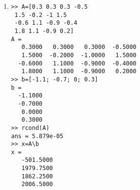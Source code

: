 \begin{exercise}
\begin{enumerate}
\item 
\begin{verbatim}
>> A=[0.3 0.3 0.3 -0.5
 1.5 -0.2 -1 1.5
 -0.6 1.1 -0.9 -0.4
 1.8 1.1 -0.9 0.2]
A =
   0.3000   0.3000   0.3000  -0.5000
   1.5000  -0.2000  -1.0000   1.5000
  -0.6000   1.1000  -0.9000  -0.4000
   1.8000   1.1000  -0.9000   0.2000
>> b=[-1.1; -0.7; 0; 0.3]
b =
  -1.1000
  -0.7000
   0.0000
   0.3000
>> rcond(A)
ans = 5.879e-05
>> x=A\b
x =
   -501.5000
   1979.7500
   1862.2500
   2006.5000
\end{verbatim}

\begin{comment}
\begin{verbatim}
m=round(2+2*rand),n=round(2+2*rand)
for it=1:999,A=0+round(randn(m,n)*10)/10; 
    if rcond(A)<1e-4, break, end, end, 
A=A
b=0+round(randn(m,1)*10)/10
rcond(A)
x=A\b
\end{verbatim}
\end{comment}

\end{enumerate}
\end{exercise}







